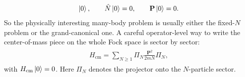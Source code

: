 \documentclass[../QFT_main.tex]{subfiles}
\begin{document}
{\small\begin{align}
\begin{aligned}
    \ket{0},\qquad \hat N\ket{0}=0,\qquad \mathbf{P}\ket{0}=0.
\end{aligned}
\end{align}}
So the physically interesting many-body problem is usually either the fixed-$N$ problem or the grand-canonical one.
A careful operator-level way to write the center-of-mass piece on the whole Fock space is sector by sector:
{\small\begin{align}
\begin{aligned}
    H_{\text{cm}}=\sum_{N\geq 1}\Pi_N\frac{\mathbf{P}^2}{2mN}\Pi_N,
\end{aligned}
\end{align}}
with $H_{\text{cm}}\ket{0}=0$.
Here $\Pi_N$ denotes the projector onto the $N$-particle sector.
\end{document}

